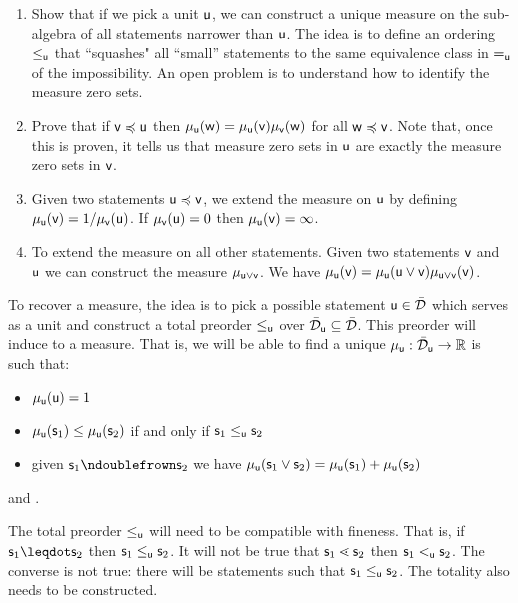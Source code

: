 \documentclass{article}
\begin{document}
\begin{enumerate}
    \item Show that if we pick a unit $\stmt[u]$, we can construct a unique measure on the sub-algebra of all statements narrower than $\stmt[u]$. The idea is to define an ordering $\leq_{\stmt[u]}$ that ``squashes" all ``small'' statements to the same equivalence class in $=_{\stmt[u]}$ of the impossibility. An open problem is to understand how to identify the measure zero sets. 
    \item Prove that if $\stmt[v] \narrower \stmt[u]$ then $\mu_{\stmt[u]}(\stmt[w]) = \mu_{\stmt[u]}(\stmt[v]) \mu_{\stmt[v]}(\stmt[w]) $ for all $\stmt[w] \narrower \stmt[v]$. Note that, once this is proven, it tells us that measure zero sets in $\stmt[u]$ are exactly the measure zero sets in $\stmt[v]$.
    \item Given two statements $\stmt[u] \narrower \stmt[v]$, we extend the measure on $\stmt[u]$ by defining $\mu_{\stmt[u]}(\stmt[v]) = 1/ \mu_{\stmt[v]}(\stmt[u])$. If $\mu_{\stmt[v]}(\stmt[u]) = 0$ then $\mu_{\stmt[u]}(\stmt[v]) = \infty$.
    \item To extend the measure on all other statements. Given two statements $\stmt[v]$ and $\stmt[u]$ we can construct the measure $\mu_{\stmt[u]\OR\stmt[v]}$. We have $\mu_{\stmt[u]}(\stmt[v]) = \mu_{\stmt[u]}(\stmt[u]\OR\stmt[v]) \mu_{\stmt[u]\OR\stmt[v]}(\stmt[v])$.
\end{enumerate}


To recover a measure, the idea is to pick a possible statement $\stmt[u] \in \tdomain$ which serves as a unit and construct a total preorder $\leq_{\stmt[u]}$ over $\tdomain_{\stmt[u]} \subseteq \tdomain$. This preorder will induce to a measure. That is, we will be able to find a unique $\mu_{\stmt[u]} : \tdomain_{\stmt[u]} \to \mathbb{R}$ is such that:
\begin{itemize}
    \item $\mu_{\stmt[u]}(\stmt[u])=1$ 
    \item $\mu_{\stmt[u]}(\stmt_1) \leq \mu_{\stmt[u]}(\stmt_2)$ if and only if  $\stmt_1 \leq_{\stmt[u]} \stmt_2$
    \item given $\stmt_1 \ncomp \stmt_2$ we have $\mu_{\stmt[u]}(\stmt_1 \OR \stmt_2) = \mu_{\stmt[u]}(\stmt_1) + \mu_{\stmt[u]}(\stmt_2)$
\end{itemize}
and .

The total preorder $\leq_{\stmt[u]}$ will need to be compatible with fineness. That is, if $\stmt_1 \finer \stmt_2$ then $\stmt_1 \leq_{\stmt[u]} \stmt_2$. It will not be true that $\stmt_1 \sfiner \stmt_2$ then $\stmt_1 <_{\stmt[u]} \stmt_2$. The converse is not true: there will be statements such that $\stmt_1 \leq_{\stmt[u]} \stmt_2$. The totality also needs to be constructed.
\end{document}
